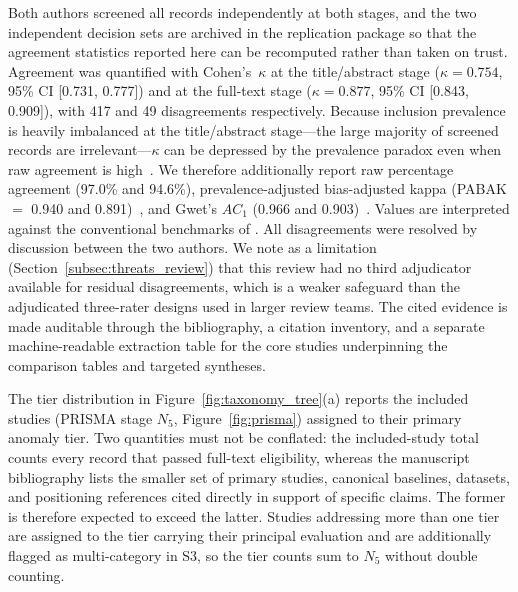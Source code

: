 \documentclass[10pt,a4paper]{article}
\newif\ifprovisionalnumbers
\newcommand{\pnum}[1]{\ifprovisionalnumbers\textcolor{orange!75!black}{\textbf{#1}}\else #1\fi}
\begin{document}
Both authors screened all records independently at both stages, and the two independent decision sets are archived in the replication package so that the agreement statistics reported here can be recomputed rather than taken on trust. Agreement was quantified with Cohen's~$\kappa$ at the title/abstract stage ($\kappa = \pnum{0.754}$, 95\% CI \pnum{[0.731, 0.777]}) and at the full-text stage ($\kappa = \pnum{0.877}$, 95\% CI \pnum{[0.843, 0.909]}), with \pnum{417} and \pnum{49} disagreements respectively. Because inclusion prevalence is heavily imbalanced at the title/abstract stage---the large majority of screened records are irrelevant---$\kappa$ can be depressed by the prevalence paradox even when raw agreement is high~\citep{byrt1993bias}. We therefore additionally report raw percentage agreement (\pnum{97.0\%} and \pnum{94.6\%}), prevalence-adjusted bias-adjusted kappa (PABAK $=$ \pnum{0.940} and \pnum{0.891})~\citep{byrt1993bias}, and Gwet's $AC_1$ (\pnum{0.966} and \pnum{0.903})~\citep{gwet2008ac1}. Values are interpreted against the conventional benchmarks of \citet{landis1977measurement}. All disagreements were resolved by discussion between the two authors. We note as a limitation (Section~\ref{subsec:threats_review}) that this review had no third adjudicator available for residual disagreements, which is a weaker safeguard than the adjudicated three-rater designs used in larger review teams. The cited evidence is made auditable through the bibliography, a citation inventory, and a separate machine-readable extraction table for the core studies underpinning the comparison tables and targeted syntheses. \ifprovisionalnumbers\textbf{The agreement values in this author-verification draft are working values and must be recomputed from the two original rater decision files before submission.}\fi

The tier distribution in Figure~\ref{fig:taxonomy_tree}(a) reports the included studies (PRISMA stage $N_5$, Figure~\ref{fig:prisma}) assigned to their primary anomaly tier. Two quantities must not be conflated: the included-study total counts every record that passed full-text eligibility, whereas the manuscript bibliography lists the smaller set of primary studies, canonical baselines, datasets, and positioning references cited directly in support of specific claims. The former is therefore expected to exceed the latter. Studies addressing more than one tier are assigned to the tier carrying their principal evaluation and are additionally flagged as multi-category in S3, so the tier counts sum to $N_5$ without double counting.
\end{document}
